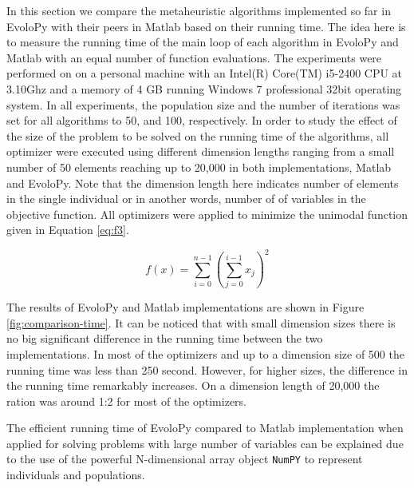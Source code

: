 \documentclass[a4paper,twoside]{article}
\begin{document}
In this section we compare the metaheuristic algorithms implemented so far in EvoloPy with their peers in Matlab based on their running time. The idea here is to measure the running time of the main loop of each algorithm in EvoloPy and Matlab with an equal number of function evaluations. The experiments were performed on on a personal machine with an  Intel(R) Core(TM) i5-2400 CPU at 3.10Ghz and a memory of 4 GB running Windows 7 professional 32bit operating system. In all experiments, the population size and the number of iterations was set for all algorithms to 50, and 100, respectively. In order to study the effect of the size of the problem to be solved on the running time of the algorithms, all optimizer were executed using different dimension lengths ranging from a small number of 50 elements reaching up to 20,000 in both implementations, Matlab and EvoloPy. Note that the dimension length here indicates number of elements in the single individual or in another words, number of of variables in the objective function. All optimizers were applied to minimize the unimodal function given in Equation \ref{eq:f3}. 



\begin{equation}
f(x)=\sum_{i=0}^{n-1}(\sum_{j=0}^{i-1}x_{j})^{2}
\label{eq:f3}
\end{equation}

The results of EvoloPy and Matlab implementations are shown in Figure \ref{fig:comparison-time}. It can be noticed that with small dimension sizes there is no big significant difference in the running time between the two implementations. In most of the optimizers and up to a dimension size of 500  the running time was less than 250 second. However, for higher sizes, the difference in the running time  remarkably increases. On a dimension length of 20,000 the ration was around 1:2 for most of the optimizers.

The efficient running time of EvoloPy compared to Matlab implementation when applied for solving problems with large number of variables can be explained due to the use of the powerful N-dimensional array object \texttt{NumPY} to represent individuals and populations.
\end{document}
